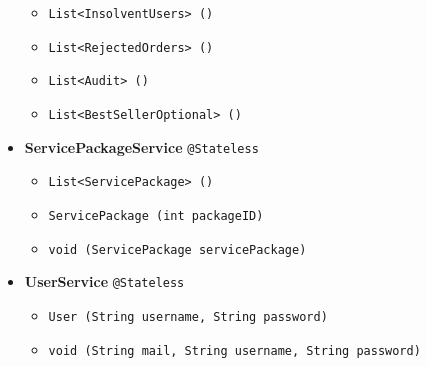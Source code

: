\begin{itemize}
\begin{itemize}[label = {$\circ$}]
            \item \texttt{List<InsolventUsers> ()}
            \item \texttt{List<RejectedOrders> ()}
            \item \texttt{List<Audit> ()}
            \item \texttt{List<BestSellerOptional> ()}
        \end{itemize}
    \item \textbf{ServicePackageService} \texttt{@Stateless}
        \begin{itemize}[label = {$\circ$}]
            \item \texttt{List<ServicePackage> ()}
            \item \texttt{ServicePackage (int packageID)}
            \item \texttt{void (ServicePackage servicePackage)}
        \end{itemize}
    \item \textbf{UserService} \texttt{@Stateless}
        \begin{itemize}[label = {$\circ$}]
            \item \texttt{User (String username, String password)}
            \item \texttt{void (String mail, String username, String password)}
        \end{itemize}  
\end{itemize}
